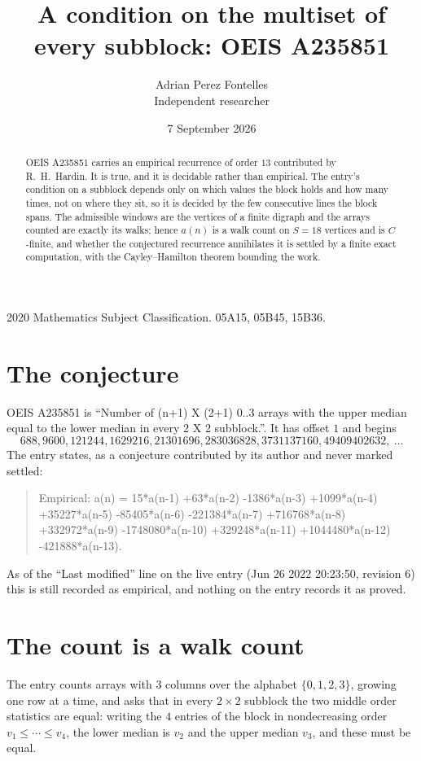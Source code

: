 \documentclass[11pt,a4paper]{article}
\title{A condition on the multiset of every subblock: OEIS A235851}
\author{Adrian Perez Fontelles\\ \small Independent researcher}
\date{7 September 2026}
\theoremstyle{plain}
\theoremstyle{definition}
\begin{document}
\maketitle

\begin{abstract}
OEIS A235851 carries an empirical recurrence of order $13$ contributed by R.~H.~Hardin. It is
true, and it is decidable rather than empirical. The entry's condition on a subblock depends
only on which values the block holds and how many times, not on where they sit, so it is
decided by the few consecutive lines the block spans. The admissible windows are the vertices
of a finite digraph and the arrays counted are exactly its walks; hence $a(n)$ is a walk count
on $S=18$ vertices and is $C$-finite, and whether the conjectured recurrence annihilates it
is settled by a finite exact computation, with the Cayley--Hamilton theorem bounding the
work.
\end{abstract}

\noindent\small 2020 Mathematics Subject Classification. 05A15, 05B45, 15B36.\normalsize

\section{The conjecture}

OEIS A235851 is ``Number of (n+1) X (2+1) 0..3 arrays with the upper median equal to the lower median in every 2 X 2 subblock.''. It has offset $1$ and begins
\[
688, 9600, 121244, 1629216, 21301696, 283036828, 3731137160, 49409402632,\ \dots
\]
The entry states, as a conjecture contributed by its author and never marked settled:
\begin{quote}
Empirical: a(n) = 15*a(n-1) +63*a(n-2) -1386*a(n-3) +1099*a(n-4) +35227*a(n-5) -85405*a(n-6) -221384*a(n-7) +716768*a(n-8) +332972*a(n-9) -1748080*a(n-10) +329248*a(n-11) +1044480*a(n-12) -421888*a(n-13).
\end{quote}
As of the ``Last modified'' line on the live entry (Jun 26 2022 20:23:50, revision 6) this is still
recorded as empirical, and nothing on the entry records it as proved.

\section{The count is a walk count}

The entry counts arrays with $3$ columns over the alphabet $\{0,1,2,3\}$, growing one row at a time, and asks that in every $2\times2$ subblock the two middle order statistics are equal: writing the $4$ entries of the block in nondecreasing order $v_1\le\cdots\le v_{4}$, the lower median is $v_{2}$ and the upper median $v_{3}$, and these must be equal.
\end{document}

